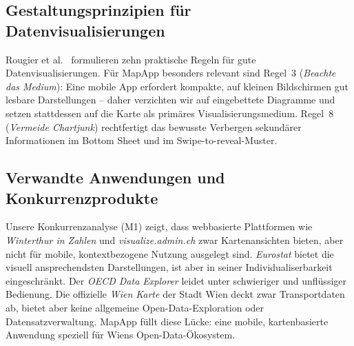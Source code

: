 \subsection{Gestaltungsprinzipien für Datenvisualisierungen}

Rougier et al.\ \cite{simple_rules} formulieren zehn praktische Regeln
für gute Datenvisualisierungen.
Für MapApp besonders relevant sind Regel~3 (\textit{Beachte das Medium}):
Eine mobile App erfordert kompakte, auf kleinen Bildschirmen gut lesbare
Darstellungen – daher verzichten wir auf eingebettete Diagramme und
setzen stattdessen auf die Karte als primäres Visualisierungsmedium.
Regel~8 (\textit{Vermeide Chartjunk}) rechtfertigt das bewusste Verbergen
sekundärer Informationen im Bottom Sheet und im Swipe-to-reveal-Muster.

\subsection{Verwandte Anwendungen und Konkurrenzprodukte}

Unsere Konkurrenzanalyse (M1) zeigt, dass webbasierte Plattformen wie
\textit{Winterthur in Zahlen} und \textit{visualize.admin.ch} zwar
Kartenansichten bieten, aber nicht für mobile, kontextbezogene Nutzung
ausgelegt sind.
\textit{Eurostat} bietet die visuell ansprechendsten Darstellungen,
ist aber in seiner Individualiserbarkeit eingeschränkt.
Der \textit{OECD Data Explorer} leidet unter schwieriger und unflüssiger
Bedienung.
Die offizielle \textit{Wien Karte} \cite{wienkarte} der Stadt Wien deckt
zwar Transportdaten ab, bietet aber keine allgemeine Open-Data-Exploration
oder Datensatzverwaltung.
MapApp füllt diese Lücke: eine mobile, kartenbasierte Anwendung
speziell für Wiens Open-Data-Ökosystem.
